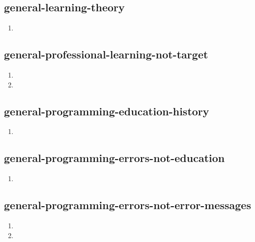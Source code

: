 \documentclass{article}
\begin{document}
\subsection{general-learning-theory}
\begin{enumerate}
\item {}
\end{enumerate}

\subsection{general-professional-learning-not-target}
\begin{enumerate}
\item {}
\item {}
\end{enumerate}

\subsection{general-programming-education-history}
\begin{enumerate}
\item {}
\end{enumerate}

\subsection{general-programming-errors-not-education}
\begin{enumerate}
\item {}
\end{enumerate}

\subsection{general-programming-errors-not-error-messages}
\begin{enumerate}
\item {}
\item {}
\end{enumerate}
\end{document}
